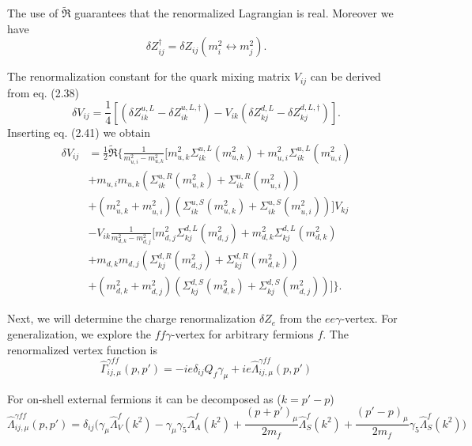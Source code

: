 The use of $\widetilde{\Re}$ guarantees that the renormalized Lagrangian is real. Moreover we have
\begin{equation}
\delta Z^\dagger_{ij}=\delta Z_{ij}(m^2_i \leftrightarrow m^2_j).
\end{equation}

The renormalization constant for the quark mixing matrix $V_{ij}$ can be derived from eq. (2.38)
\begin{equation}
\delta V_{ij}=\frac{1}{4}[(\delta Z^{u,L}_{ik}-\delta Z^{u,L,\dagger}_{ik})-V_{ik}(\delta Z^{d,L}_{kj}-\delta Z^{d,L,\dagger}_{kj})].
\end{equation}
Inserting eq. (2.41) we obtain
\begin{align}
\delta V_{ij}&=\frac{1}{2}\widetilde{\Re}\biggl\{\frac{1}{m^2_{u,i}-m^2_{u,k}}[m^2_{u,k}\Sigma^{u,L}_{ik}(m^2_{u,k})+m^2_{u,i}\Sigma^{u,L}_{ik}(m^2_{u,i})\nonumber\\ &+m_{u,i}m_{u,k}(\Sigma^{u,R}_{ik}(m^2_{u,k})+\Sigma^{u,R}_{ik}(m^2_{u,i}))\nonumber\\
&+(m^2_{u,k}+m^2_{u,i})(\Sigma^{u,S}_{ik}(m^2_{u,k})+\Sigma^{u,S}_{ik}(m^2_{u,i}))]V_{kj}\nonumber\\
&-V_{ik}\frac{1}{m^2_{d,k}-m^2_{d,j}}[ m^2_{d,j}\Sigma^{d,L}_{kj}(m^2_{d,j})+m^2_{d,k}\Sigma^{d,L}_{kj}(m^2_{d,k})\nonumber\\ &+m_{d,k}m_{d,j}(\Sigma^{d,R}_{kj}(m^2_{d,j})+\Sigma^{d,R}_{kj}(m^2_{d,k}))\nonumber\\
&+(m^2_{d,k}+m^2_{d,j})(\Sigma^{d,S}_{kj}(m^2_{d,k})+\Sigma^{d,S}_{kj}(m^2_{d,j}))  ]
\biggr\}.
\end{align}

Next, we will determine the charge renormalization $\delta Z_e$ from the $ee\gamma$-vertex. For generalization, we explore the $ff\gamma$-vertex for arbitrary fermions $f$. The renormalized vertex function is 
\begin{equation}
\hat{\Gamma}^{\gamma ff}_{ij,\mu}(p,p')=-ie\delta_{ij}Q_f\gamma_\mu+ie\hat{\Lambda}^{\gamma ff}_{ij,\mu}(p,p')
\end{equation}

For on-shell external fermions it can be decomposed as ($k=p'-p$)
\begin{equation}
\hat{\Lambda}^{\gamma ff}_{ij,\mu}(p,p')=\delta_{ij}\biggl(\gamma_\mu \hat{\Lambda}^f_V(k^2)-\gamma_\mu\gamma_5\hat{\Lambda}^f_A(k^2)+ \frac{(p+p')_\mu}{2m_f}\hat{\Lambda}^f_S(k^2)+\frac{(p'-p)_\mu}{2m_f}\gamma_5\hat{\Lambda}^f_S(k^2)\biggr)
\end{equation}

